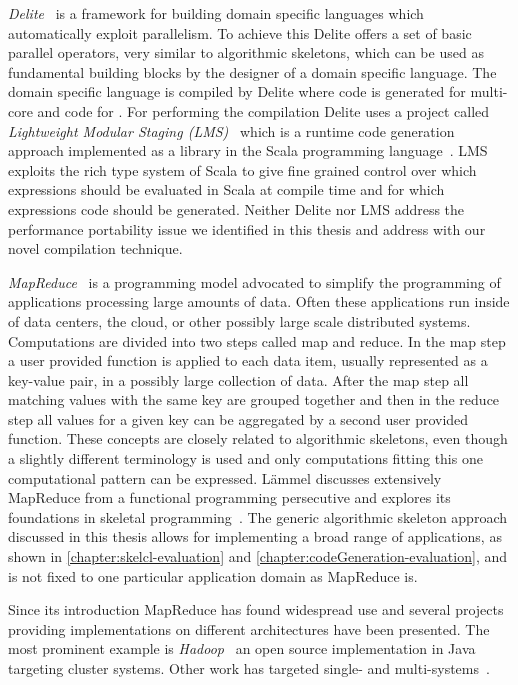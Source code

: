 \emph{Delite}~\cite{ChafiSBLAO11,LeeBSCROO11,BrownSLRCOO11} is a framework for building domain specific languages which automatically exploit parallelism.
To achieve this Delite offers a set of basic parallel operators, very similar to algorithmic skeletons, which can be used as fundamental building blocks by the designer of a domain specific language.
The domain specific language is compiled by Delite where \Cpp code is generated for multi-core \CPUs and \CUDA code for \GPUs.
For performing the compilation Delite uses a project called \emph{Lightweight Modular Staging  ({\small LMS})}~\cite{RompfO12} which is a runtime code generation approach implemented as a library in the Scala programming language~\cite{Odersky06,OderskyR14}.
{\small LMS} exploits the rich type system of Scala to give fine grained control over which expressions should be evaluated in Scala at compile time and for which expressions code should be generated.
Neither Delite nor {\small LMS} address the performance portability issue we identified in this thesis and address with our novel compilation technique.

\bigskip

\emph{MapReduce}~\cite{DeanG04} is a programming model advocated to simplify the programming of applications processing large amounts of data.
Often these applications run inside of data centers, the cloud, or other possibly large scale distributed systems.
Computations are divided into two steps called map and reduce.
In the map step a user provided function is applied to each data item, usually represented as a key-value pair, in a possibly large collection of data.
After the map step all matching values with the same key are grouped together and then in the reduce step all values for a given key can be aggregated by a second user provided function.
These concepts are closely related to algorithmic skeletons, even though a slightly different terminology is used and only computations fitting this one computational pattern can be expressed.
L{\"a}mmel discusses extensively MapReduce from a functional programming persecutive and explores its foundations in skeletal programming~\cite{Laemmel2007}.
The generic algorithmic skeleton approach discussed in this thesis allows for implementing a broad range of applications, as shown in \autoref{chapter:skelcl-evaluation} and \autoref{chapter:codeGeneration-evaluation}, and is not fixed to one particular application domain as MapReduce is.

Since its introduction MapReduce has found widespread use and several projects providing implementations on different architectures have been presented.
The most prominent example is \emph{Hadoop}~\cite{Hadoop} an open source implementation in Java targeting cluster systems.
Other work has targeted single- and multi-\GPU systems~\cite{StuartO11,FangHLG11}.

